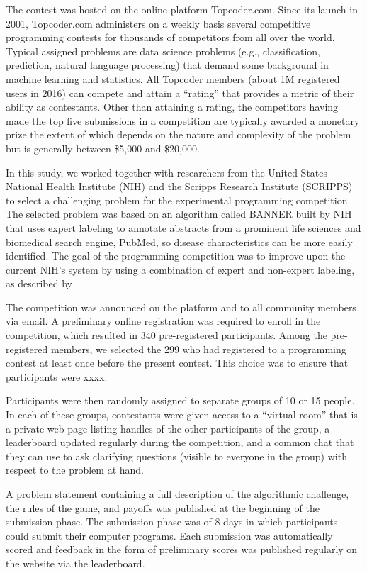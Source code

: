 \documentclass[12pt,]{article}
\theoremstyle{plain} %
\begin{document}
The contest was hosted on the online platform Topcoder.com. Since its
launch in 2001, Topcoder.com administers on a weekly basis several
competitive programming contests for thousands of competitors from all
over the world. Typical assigned problems are data science problems
(e.g., classification, prediction, natural language processing) that
demand some background in machine learning and statistics. All Topcoder
members (about 1M registered users in 2016) can compete and attain a
``rating'' that provides a metric of their ability as contestants. Other
than attaining a rating, the competitors having made the top five
submissions in a competition are typically awarded a monetary prize the
extent of which depends on the nature and complexity of the problem but
is generally between \$5,000 and \$20,000.

In this study, we worked together with researchers from the United
States National Health Institute (NIH) and the Scripps Research
Institute (SCRIPPS) to select a challenging problem for the experimental
programming competition. The selected problem was based on an algorithm
called BANNER built by NIH \citep{leaman2008banner} that uses expert
labeling to annotate abstracts from a prominent life sciences and
biomedical search engine, PubMed, so disease characteristics can be more
easily identified. The goal of the programming competition was to
improve upon the current NIH's system by using a combination of expert
and non-expert labeling, as described by \citet{good2014microtask}.

The competition was announced on the platform and to all community
members via email. A preliminary online registration was required to
enroll in the competition, which resulted in 340 pre-registered
participants. Among the pre-registered members, we selected the 299 who
had registered to a programming contest at least once before the present
contest. This choice was to ensure that participants were xxxx.

Participants were then randomly assigned to separate groups of 10 or 15
people. In each of these groups, contestants were given access to a
``virtual room'' that is a private web page listing handles of the other
participants of the group, a leaderboard updated regularly during the
competition, and a common chat that they can use to ask clarifying
questions (visible to everyone in the group) with respect to the problem
at hand.

A problem statement containing a full description of the algorithmic
challenge, the rules of the game, and payoffs was published at the
beginning of the submission phase. The submission phase was of 8 days in
which participants could submit their computer programs. Each submission
was automatically scored and feedback in the form of preliminary scores
was published regularly on the website via the leaderboard.
\end{document}
